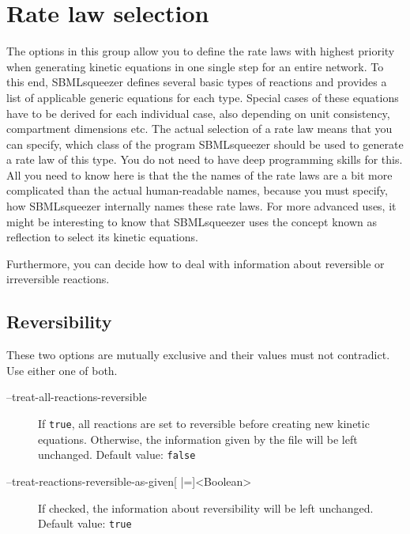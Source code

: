 \section{Rate law selection}
\label{sec:Rate_law_selection}
The options in this group allow you to define the rate laws with highest
priority when generating kinetic equations in one single step for an entire
network.
To this end, SBMLsqueezer defines several basic types of reactions and provides
a list of applicable generic equations for each type. Special cases of these
equations have to be derived for each individual case, also depending on
unit consistency, compartment dimensions etc.
The actual selection of a rate law means that you can specify, which class of
the program SBMLsqueezer should be used to generate a rate law of this type.
You do not need to have deep programming skills for this. All you need to know
here is that the the names of the rate laws are a bit more complicated than the
actual human-readable names, because you must specify, how SBMLsqueezer
internally names these rate laws. For more advanced uses, it might be
interesting to know that SBMLsqueezer uses the concept known as reflection to
select its kinetic equations.

Furthermore, you can decide how to deal with information about reversible or
irreversible reactions.

\subsection{Reversibility}

These two options are mutually exclusive and their values must not contradict.
Use either one of both.
\begin{description}
\item[--treat-all-reactions-reversible]
  If \texttt{true}, all reactions are set to reversible before creating
  new kinetic equations. Otherwise, the information given by the
  \SBML file will be left unchanged.
  Default value: \texttt{false}

\item[--treat-reactions-reversible-as-given{[} |={]}<Boolean>]
  If checked, the information about reversibility will be left unchanged.
  Default value: \texttt{true}
\end{description}

